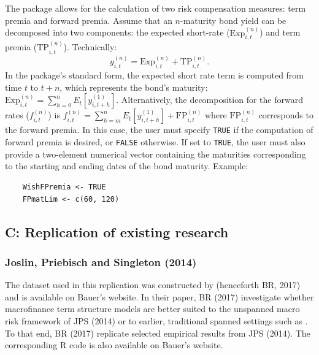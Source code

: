 The  package allows for the calculation
of two risk compensation measures: term premia and forward premia. Assume that an \(n\)-maturity bond yield can be decomposed into two components: the expected short-rate (\(\mathrm{Exp}_{i,t}^{(n)}\)) and term premia
(\(\mathrm{TP}_{i,t}^{(n)}\)).
Technically:
\[
y_{i,t}^{(n)} = \mathrm{Exp}_{i,t}^{(n)} + \mathrm{TP}_{i,t}^{(n)} \text{.}
\] In the package's standard form, the expected short rate term is
computed from time \(t\) to \(t+n\), which represents the bond's maturity:
\(\mathrm{Exp}_{i,t}^{(n)} = \sum_{h=0}^{n} E_t[y_{i, t+h}^{(1)}]\). Alternatively,
the decomposition for the forward rates (\(f_{i,t}^{(n)}\)) is
\(f_{i,t}^{(n)} = \sum_{h=m}^{n} E_t[y_{i,t+h}^{(1)}] + \mathrm{FP}_{i,t}^{(n)}\) where
\(\mathrm{FP}_{i,t}^{(n)}\) corresponds to the forward premia. In this case, the user
must specify \texttt{TRUE} if the computation of forward
premia is desired, or \texttt{FALSE} otherwise. If set to \texttt{TRUE}, the user must also
provide a two-element numerical vector containing the maturities
corresponding to the starting and ending dates of the bond maturity.
Example:

\begin{verbatim}
    WishFPremia <- TRUE
    FPmatLim <- c(60, 120)
\end{verbatim}

\subsection*{C: Replication of existing research}\label{c-replication-of-existing-research}

\subsubsection{Joslin, Priebisch and Singleton (2014)}\label{joslin-priebisch-and-singleton-2014}

The dataset used in this replication was constructed by \citet{BauerRudebusch2017} (henceforth BR, 2017) and is available on Bauer's website. In their paper, BR (2017) investigate whether macrofinance term structure models are better suited to the unspanned macro risk framework of JPS (2014) or to earlier, traditional spanned settings such as \citet{AngPiazzesi2003}. To that end, BR (2017) replicate selected empirical results from JPS (2014). The corresponding R code is also available on Bauer's website.

